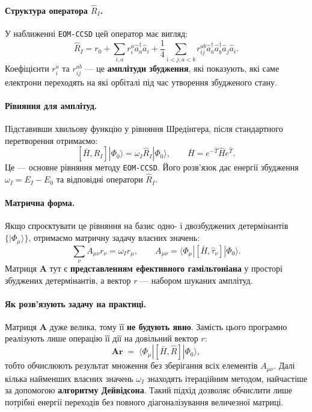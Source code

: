 \paragraph{Структура оператора \(\hat{R}_I\).}
У наближенні \texttt{EOM-CCSD} цей оператор має вигляд:
\[
    \hat{R}_I = r_0 +
    \sum_{i,a} r_i^a \hat{a}_a^\dagger \hat{a}_i +
    \frac{1}{4}\sum_{i<j,a<b} r_{ij}^{ab}
    \hat{a}_a^\dagger \hat{a}_b^\dagger \hat{a}_j \hat{a}_i.
\]
Коефіцієнти \(r_i^a\) та \(r_{ij}^{ab}\) --- це \textbf{амплітуди збудження},
які показують, які саме електрони переходять на які орбіталі
під час утворення збудженого стану.

\paragraph{Рівняння для амплітуд.}
Підставивши хвильову функцію у рівняння Шредінгера,
після стандартного перетворення отримаємо:
\[
    [\bar{H}, \hat{R}_I]|\Phi_0\rangle = \omega_I \hat{R}_I|\Phi_0\rangle,
    \qquad
    \bar{H} = e^{-\hat{T}}\hat{H}e^{\hat{T}}.
\]
Це --- основне рівняння методу \texttt{EOM-CCSD}.
Його розв’язок дає енергії збудження \(\omega_I = E_I - E_0\)
та відповідні оператори \(\hat{R}_I\).

\paragraph{Матрична форма.}
Якщо спроєктувати це рівняння на базис одно- і двозбуджених детермінантів
\(\{|\Phi_\mu\rangle\}\), отримаємо матричну задачу власних значень:
\[
    \sum_\nu A_{\mu\nu} r_\nu = \omega_I r_\mu,
    \qquad
    A_{\mu\nu} = \langle \Phi_\mu | [\bar{H}, \hat{\tau}_\nu] | \Phi_0\rangle.
\]
Матриця \(\mathbf{A}\) тут є \textbf{представленням ефективного гамільтоніана}
у просторі збуджених детермінантів, а вектор \(r\) --- набором шуканих амплітуд.

\paragraph{Як розв’язують задачу на практиці.}
Матриця \(\mathbf{A}\) дуже велика, тому її \textbf{не будують явно}.
Замість цього програмно реалізують лише операцію її дії на довільний вектор \(r\):
\[
    \mathbf{A}\mathbf{r} \;=\; \langle \Phi_\mu | [\bar{H}, \hat{R}] | \Phi_0\rangle,
\]
тобто обчислюють результат множення без зберігання всіх елементів \(A_{\mu\nu}\).
Далі кілька найменших власних значень \(\omega_I\)
знаходять ітераційним методом, найчастіше за допомогою
\textbf{алгоритму Дейвідсона}.
Такий підхід дозволяє обчислити лише потрібні енергії переходів
без повного діагоналізування величезної матриці.

